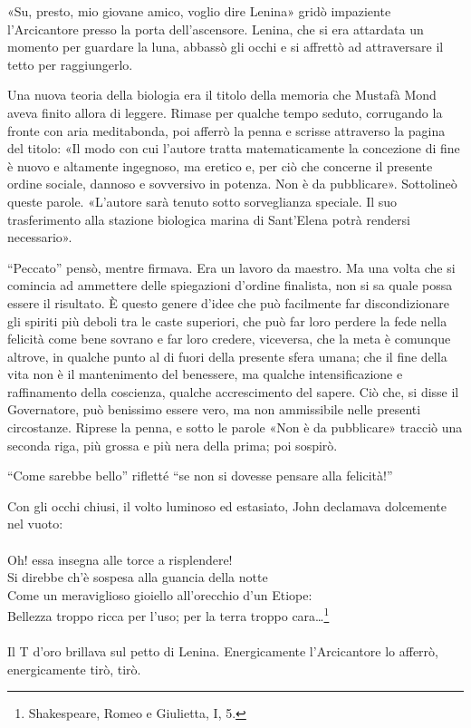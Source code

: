 \documentclass[
a5paper, %
10pt, %
twoside, 
onecolumn, %
openany, %
]{memoir}
\begin{document}
«Su, presto, mio giovane amico, voglio dire Lenina» gridò impaziente l’Arcicantore presso la porta dell’ascensore. Lenina, che si era attardata un momento per guardare la luna, abbassò gli occhi e si affrettò ad attraversare il tetto per raggiungerlo.

Una nuova teoria della biologia era il titolo della memoria che Mustafà Mond aveva finito allora di leggere. Rimase per qualche tempo seduto, corrugando la fronte con aria meditabonda, poi afferrò la penna e scrisse attraverso la pagina del titolo: «Il modo con cui l’autore tratta matematicamente la concezione di fine è nuovo e altamente ingegnoso, ma eretico e, per ciò che concerne il presente ordine sociale, dannoso e sovversivo in potenza. Non è da pubblicare». Sottolineò queste parole. «L’autore sarà tenuto sotto sorveglianza speciale. Il suo trasferimento alla stazione biologica marina di Sant’Elena potrà rendersi necessario».

“Peccato” pensò, mentre firmava. Era un lavoro da maestro. Ma una volta che si comincia ad ammettere delle spiegazioni d’ordine finalista, non si sa quale possa essere il risultato. È questo genere d’idee che può facilmente far discondizionare gli spiriti più deboli tra le caste superiori, che può far loro perdere la fede nella felicità come bene sovrano e far loro credere, viceversa, che la meta è comunque altrove, in qualche punto al di fuori della presente sfera umana; che il fine della vita non è il mantenimento del benessere, ma qualche intensificazione e raffinamento della coscienza, qualche accrescimento del sapere. Ciò che, si disse il Governatore, può benissimo essere vero, ma non ammissibile nelle presenti circostanze. Riprese la penna, e sotto le parole «Non è da pubblicare» tracciò una seconda riga, più grossa e più nera della prima; poi sospirò.

“Come sarebbe bello” rifletté “se non si dovesse pensare alla felicità!”

Con gli occhi chiusi, il volto luminoso ed estasiato, John declamava dolcemente nel vuoto:
\leavevmode\\\leavevmode\\
{\tiny Oh! essa insegna alle torce a risplendere!\\
Si direbbe ch’è sospesa alla guancia della notte\\
Come un meraviglioso gioiello all’orecchio d’un Etiope:\\
Bellezza troppo ricca per l’uso; per la terra troppo cara…}\footnote{Shakespeare, Romeo e Giulietta, I, 5.}
\leavevmode\\\leavevmode\\
Il T d’oro brillava sul petto di Lenina. Energicamente l’Arcicantore lo afferrò, energicamente tirò, tirò.
\end{document}
